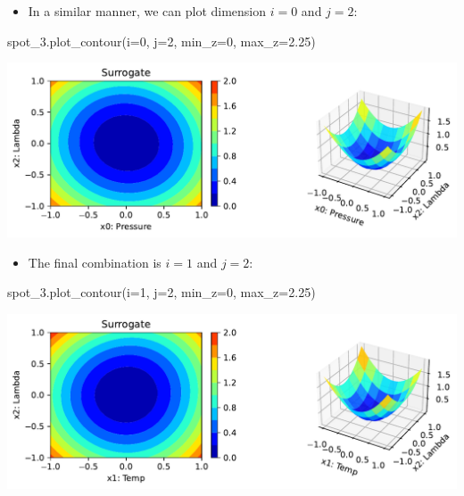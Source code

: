 \documentclass[
  letterpaper,
  DIV=11,
  numbers=noendperiod]{scrreprt}
\newenvironment{Shaded}{\begin{snugshade}}{\end{snugshade}}
\newcommand{\DecValTok}[1]{\textcolor[rgb]{0.68,0.00,0.00}{#1}}
\newcommand{\FloatTok}[1]{\textcolor[rgb]{0.68,0.00,0.00}{#1}}
\newcommand{\NormalTok}[1]{\textcolor[rgb]{0.00,0.23,0.31}{#1}}
\newcommand{\OperatorTok}[1]{\textcolor[rgb]{0.37,0.37,0.37}{#1}}
\providecommand{\tightlist}{%
  \setlength{\itemsep}{0pt}\setlength{\parskip}{0pt}}\usepackage{longtable,booktabs,array}
\begin{document}
\begin{itemize}
\tightlist
\item
  In a similar manner, we can plot dimension \(i=0\) and \(j=2\):
\end{itemize}

\begin{Shaded}
\begin{Highlighting}[]
\NormalTok{spot\_3.plot\_contour(i}\OperatorTok{=}\DecValTok{0}\NormalTok{, j}\OperatorTok{=}\DecValTok{2}\NormalTok{, min\_z}\OperatorTok{=}\DecValTok{0}\NormalTok{, max\_z}\OperatorTok{=}\FloatTok{2.25}\NormalTok{)}
\end{Highlighting}
\end{Shaded}

\includegraphics{008_num_spot_multidim_files/figure-pdf/cell-8-output-1.pdf}

\begin{itemize}
\tightlist
\item
  The final combination is \(i=1\) and \(j=2\):
\end{itemize}

\begin{Shaded}
\begin{Highlighting}[]
\NormalTok{spot\_3.plot\_contour(i}\OperatorTok{=}\DecValTok{1}\NormalTok{, j}\OperatorTok{=}\DecValTok{2}\NormalTok{, min\_z}\OperatorTok{=}\DecValTok{0}\NormalTok{, max\_z}\OperatorTok{=}\FloatTok{2.25}\NormalTok{)}
\end{Highlighting}
\end{Shaded}

\includegraphics{008_num_spot_multidim_files/figure-pdf/cell-9-output-1.pdf}
\end{document}
